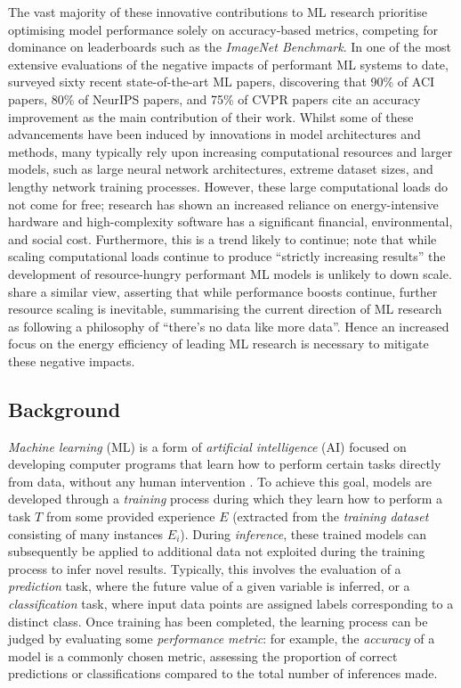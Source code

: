 \documentclass[a4paper, 12pt]{article}
\begin{document}
    The vast majority of these innovative contributions to ML research prioritise optimising model performance solely on accuracy-based metrics, competing for dominance on leaderboards such as the \emph{ImageNet Benchmark}. In one of the most extensive evaluations of the negative impacts of performant ML systems to date, \citet{schwartz-2019} surveyed sixty recent state-of-the-art ML papers, discovering that 90\% of ACI papers, 80\% of NeurIPS papers, and 75\% of CVPR papers cite an accuracy improvement as the main contribution of their work. Whilst some of these advancements have been induced by innovations in model architectures and methods, many typically rely upon increasing computational resources and larger models, such as large neural network architectures, extreme dataset sizes, and lengthy network training processes. However, these large computational loads do not come for free; research has shown an increased reliance on energy-intensive hardware and high-complexity software has a significant financial, environmental, and social cost. Furthermore, this is a trend likely to continue; \citet{devlin-2019} note that while scaling computational loads continue to produce ``strictly increasing results” the development of resource-hungry performant ML models is unlikely to down scale. \citet{bender-2021} share a similar view, asserting that while performance boosts continue, further resource scaling is inevitable, summarising the current direction of ML research as following a philosophy of ``there's no data like more data”. Hence an increased focus on the energy efficiency of leading ML research is necessary to mitigate these negative impacts.

    \subsection{Background}

    \emph{Machine learning} (ML) is a form of \emph{artificial intelligence} (AI) focused on developing computer programs that learn how to perform certain tasks directly from data, without any human intervention \citep{samuel-1959}. To achieve this goal, models are developed through a \emph{training} process during which they learn how to perform a task $T$ from some provided experience $E$ (extracted from the \emph{training dataset} consisting of many instances $E_i$). During \emph{inference}, these trained models can subsequently be applied to additional data not exploited during the training process to infer novel results. Typically, this involves the evaluation of a \emph{prediction} task, where the future value of a given variable is inferred, or a \emph{classification} task, where input data points are assigned labels corresponding to a distinct class. Once training has been completed, the learning process can be judged by evaluating some \emph{performance metric}: for example, the \emph{accuracy} of a model is a commonly chosen metric, assessing the proportion of correct predictions or classifications compared to the total number of inferences made. 
\end{document}
